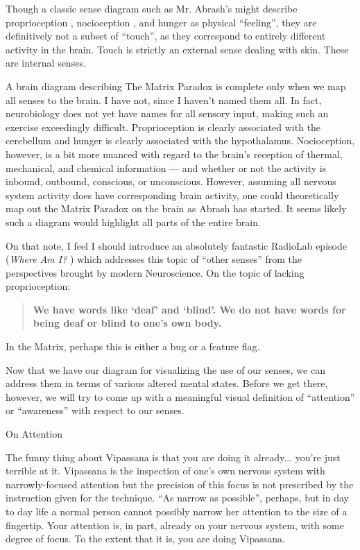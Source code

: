 \documentclass{article}
\begin{document}
Though a classic sense diagram such as Mr. Abrash's might describe proprioception \cite{ramachandranbrainfunction, proprioception}, nocioception \cite{nocioception}, and hunger \cite{fmrihunger} as physical ``feeling'', they are definitively not a subset of ``touch'', as they correspond to entirely different activity in the brain. Touch is strictly an external sense dealing with skin. These are internal senses.

A brain diagram describing The Matrix Paradox is complete only when we map all senses to the brain. I have not, since I haven't named them all. In fact, neurobiology does not yet have names for all sensory input, making such an exercise exceedingly difficult. Proprioception is clearly associated with the cerebellum and hunger is clearly associated with the hypothalamus. Nocioception, however, is a bit more nuanced with regard to the brain's reception of thermal, mechanical, and chemical information — and whether or not the activity is inbound, outbound, conscious, or unconscious. However, assuming all nervous system activity does have corresponding brain activity, one could theoretically map out the Matrix Paradox on the brain as Abrash has started. It seems likely such a diagram would highlight all parts of the entire brain.

On that note, I feel I should introduce an absolutely fantastic RadioLab episode (\textit{Where Am I?} \cite{whereami}) which addresses this topic of ``other senses'' from the perspectives brought by modern Neuroscience. On the topic of lacking proprioception:

\begin{quote}
  \textbf{We have words like `deaf' and `blind'. We do not have words for being deaf or blind to one's own body.}
\end{quote}

In the Matrix, perhaps this is either a bug or a feature flag.

Now that we have our diagram for visualizing the use of our senses, we can address them in terms of various altered mental states. Before we get there, however, we will try to come up with a meaningful visual definition of ``attention'' or ``awareness'' with respect to our senses.


\pagebreak

\begin{center}
  \Huge{On Attention}
\end{center}

The funny thing about Vipassana is that you are doing it already... you're just terrible at it. Vipassana is the inspection of one's own nervous system with narrowly-focused attention but the precision of this focus is not prescribed by the instruction given for the technique. ``As narrow as possible'', perhaps, but in day to day life a normal person cannot possibly narrow her attention to the size of a fingertip. Your attention is, in part, already on your nervous system, with some degree of focus. To the extent that it is, you are doing Vipassana.
\end{document}
